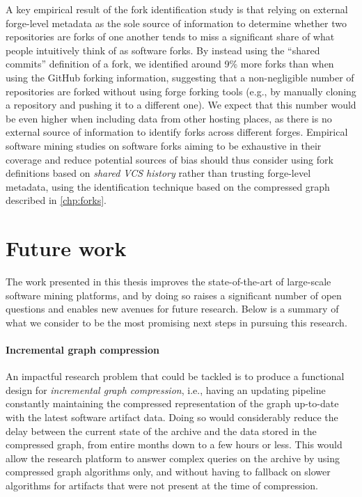 A key empirical result of the fork identification study is that relying on
external forge-level metadata as the sole source of information to determine
whether two repositories are forks of one another tends to miss a
significant share of what people intuitively think of as software forks.
By instead using the ``shared commits'' definition of a fork, we identified
around 9\% more forks than when using the GitHub forking information,
suggesting that a non-negligible number of repositories are forked without
using forge forking tools (e.g., by manually cloning a repository and pushing
it to a different one). We expect that this number would be even higher when
including data from other hosting places, as there is no external source of
information to identify forks across different forges. Empirical software
mining studies on software forks aiming to be exhaustive in their coverage and
reduce potential sources of bias should thus consider using fork definitions
based on \emph{shared \gls{VCS} history} rather than trusting forge-level
metadata, using the identification technique based on the compressed graph
described in \cref{chp:forks}.

\section{Future work}

The work presented in this thesis improves the state-of-the-art of large-scale
software mining platforms, and by doing so raises a significant number of open
questions and enables new avenues for future research. Below is a summary of
what we consider to be the most promising next steps in pursuing this research.

\paragraph*{Incremental graph compression}

An impactful research problem that could be tackled is to produce a
functional design for \emph{incremental graph compression}, i.e., having an
updating pipeline constantly maintaining the compressed representation of the
graph up-to-date with the latest software artifact data. Doing so would
considerably reduce the delay between the current state of the archive and the
data stored in the compressed graph, from entire months down to a few hours or
less. This would allow the research platform to answer complex queries on the
archive by using compressed graph algorithms only, and without having to
fallback on slower algorithms for artifacts that were not present at the time
of compression.

